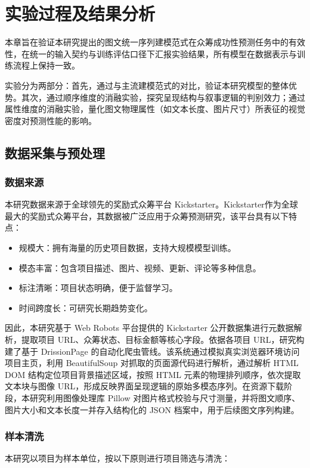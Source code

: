 \newpage
\setcounter{table}{0}
\setcounter{figure}{0}
\section{实验过程及结果分析}
本章旨在验证本研究提出的图文统一序列建模范式在众筹成功性预测任务中的有效性，在统一的输入契约与训练评估口径下汇报实验结果，所有模型在数据表示与训练流程上保持一致。

实验分为两部分：首先，通过与主流建模范式的对比，验证本研究模型的整体优势。其次，通过顺序维度的消融实验，探究呈现结构与叙事逻辑的判别效力；通过属性维度的消融实验，量化图文物理属性（如文本长度、图片尺寸）所表征的视觉密度对预测性能的影响。

\subsection{数据采集与预处理}
\subsubsection{数据来源}
本研究数据来源于全球领先的奖励式众筹平台 Kickstarter。Kickstarter作为全球最大的奖励式众筹平台，其数据被广泛应用于众筹预测研究，该平台具有以下特点：

\begin{itemize}
  \item 规模大：拥有海量的历史项目数据，支持大规模模型训练。
  \item 模态丰富：包含项目描述、图片、视频、更新、评论等多种信息。
  \item 标注清晰：项目状态明确，便于监督学习。
  \item 时间跨度长：可研究长期趋势变化。
\end{itemize}

因此，本研究基于 Web Robots 平台提供的 Kickstarter 公开数据集进行元数据解析，提取项目 URL、众筹状态、目标金额等核心字段。依据各项目 URL，研究构建了基于 DrissionPage 的自动化爬虫管线。该系统通过模拟真实浏览器环境访问项目主页，利用 BeautifulSoup 对抓取的页面源代码进行解析，通过解析 HTML DOM 结构定位项目背景描述区域，按照 HTML 元素的物理排列顺序，依次提取文本块与图像 URL，形成反映界面呈现逻辑的原始多模态序列。在资源下载阶段，本研究利用图像处理库 Pillow 对图片格式校验与尺寸测量，并将图文顺序、图片大小和文本长度一并存入结构化的 JSON 档案中，用于后续图文序列构建。

\subsubsection{样本清洗}
本研究以项目为样本单位，按以下原则进行项目筛选与清洗：

